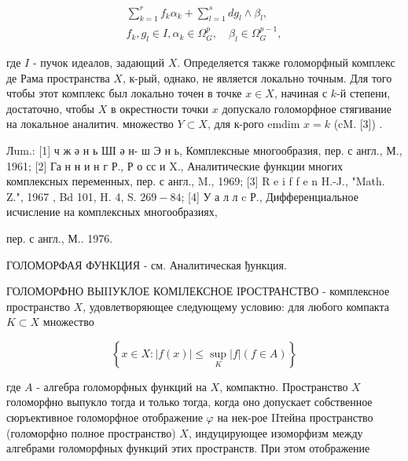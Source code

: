 \documentclass[10pt]{article}
\begin{document}
\[

\begin{gathered}

\sum_{k=1}^{r} f_{k} \alpha_{k}+\sum_{l=1}^{s} d g_{l} \wedge \beta_{l}, \\

f_{k}, g_{l} \in I, \alpha_{k} \in \Omega_{G}^{p}, \quad \beta_{l} \in \Omega_{G}^{p-1},

\end{gathered}

\]



где $I$ - пучок идеалов, задающий $X$. Определяется также голоморфный комплекс де Рама пространства $X$, к-рый, однако, не является локально точным. Для того чтобы этот комплекс был локально точен в точке $x \in X$, начиная с $k$-й степени, достаточно, чтобы $X$ в окрестности точки $x$ допускало голоморфное стягивание на локальное аналитич. множество $Y \subset X$, для к-рого emdim $x=k$ (cM. [3]) .



Лum.: [1] ч ж ә н ь ШІ ә н- ш Э н ь, Комплексные многообразия, пер. с англ., М., 1961; [2] Га н н и н г Р., Р о сс и X., Аналитические функции многих комплексных переменных, пер. с англ., M., 1969; [3] R e i f f e n H.-J., "Math. Z.", 1967 , Bd 101, H. 4, S. $269-84$; [4] У а л л c Р., Дифференциальное исчисление на комплексных многообразиях,

пер. с англ., М.. 1976.



ГОЛОМОРФАЯ ФУНКЦИЯ - см. Аналитическая ђункция.



ГОЛОМОРФНО ВЫIIУКЛОЕ КОМІЛЕКСНОЕ ІРОСТРАНСТВО - комплексное пространство $X$, удовлетворяющее следующему условию: для любого компакта $K \subset X$ множество



\[

\left\{x \in X:|f(x)| \leqslant \sup _{K}|f|(f \in A)\right\}

\]



где $A$ - алгебра голоморфных функций на $X$, компактно. Пространство $X$ голоморфно выпукло тогда и только тогда, когда оно допускает собственное сюръективное голоморфное отображение $\varphi$ на нек-рое IIтейна пространство (голоморфно полное пространство) $X$, индуцирующее изоморфизм между алгебрами голоморфных функций этих пространств. При этом отображение
\end{document}

